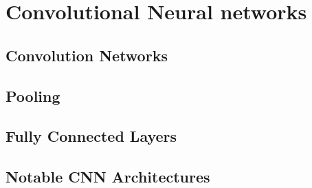\section{Convolutional Neural networks}

\subsection{Convolution Networks}
\subsection{Pooling}
\subsection{Fully Connected Layers}
\subsection{Notable CNN Architectures}
